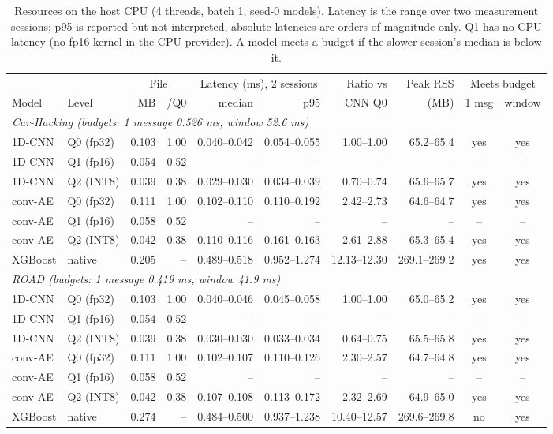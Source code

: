\begin{table}[t]
\centering
\footnotesize
\setlength{\tabcolsep}{3pt}
\caption{Resources on the host CPU (4 threads, batch 1, seed-0 models). Latency is the range over two measurement sessions; p95 is reported but not interpreted, absolute latencies are orders of magnitude only. Q1 has no CPU latency (no fp16 kernel in the CPU provider). A model meets a budget if the slower session's median is below it.}
\label{tab:resources}
\begin{tabular}{@{}llrrrrrrcc@{}}
\toprule
& & \multicolumn{2}{c}{File} & \multicolumn{2}{c}{Latency (ms), 2 sessions} & Ratio vs & Peak RSS & \multicolumn{2}{c}{Meets budget} \\
\cmidrule(lr){3-4}\cmidrule(lr){5-6}\cmidrule(lr){9-10}
Model & Level & MB & /Q0 & median & p95 & CNN Q0 & (MB) & 1 msg & window \\
\midrule
\multicolumn{10}{l}{\textit{Car-Hacking (budgets: 1 message 0.526 ms, window 52.6 ms)}} \\
1D-CNN & Q0 (fp32) & 0.103 & 1.00 & 0.040--0.042 & 0.054--0.055 & 1.00--1.00 & 65.2--65.4 & yes & yes \\
1D-CNN & Q1 (fp16) & 0.054 & 0.52 & -- & -- & -- & -- & -- & -- \\
1D-CNN & Q2 (INT8) & 0.039 & 0.38 & 0.029--0.030 & 0.034--0.039 & 0.70--0.74 & 65.6--65.7 & yes & yes \\
conv-AE & Q0 (fp32) & 0.111 & 1.00 & 0.102--0.110 & 0.110--0.192 & 2.42--2.73 & 64.6--64.7 & yes & yes \\
conv-AE & Q1 (fp16) & 0.058 & 0.52 & -- & -- & -- & -- & -- & -- \\
conv-AE & Q2 (INT8) & 0.042 & 0.38 & 0.110--0.116 & 0.161--0.163 & 2.61--2.88 & 65.3--65.4 & yes & yes \\
XGBoost & native & 0.205 & -- & 0.489--0.518 & 0.952--1.274 & 12.13--12.30 & 269.1--269.2 & yes & yes \\
\midrule
\multicolumn{10}{l}{\textit{ROAD (budgets: 1 message 0.419 ms, window 41.9 ms)}} \\
1D-CNN & Q0 (fp32) & 0.103 & 1.00 & 0.040--0.046 & 0.045--0.058 & 1.00--1.00 & 65.0--65.2 & yes & yes \\
1D-CNN & Q1 (fp16) & 0.054 & 0.52 & -- & -- & -- & -- & -- & -- \\
1D-CNN & Q2 (INT8) & 0.039 & 0.38 & 0.030--0.030 & 0.033--0.034 & 0.64--0.75 & 65.5--65.8 & yes & yes \\
conv-AE & Q0 (fp32) & 0.111 & 1.00 & 0.102--0.107 & 0.110--0.126 & 2.30--2.57 & 64.7--64.8 & yes & yes \\
conv-AE & Q1 (fp16) & 0.058 & 0.52 & -- & -- & -- & -- & -- & -- \\
conv-AE & Q2 (INT8) & 0.042 & 0.38 & 0.107--0.108 & 0.113--0.172 & 2.32--2.69 & 64.9--65.0 & yes & yes \\
XGBoost & native & 0.274 & -- & 0.484--0.500 & 0.937--1.238 & 10.40--12.57 & 269.6--269.8 & no & yes \\
\bottomrule
\end{tabular}
\end{table}
